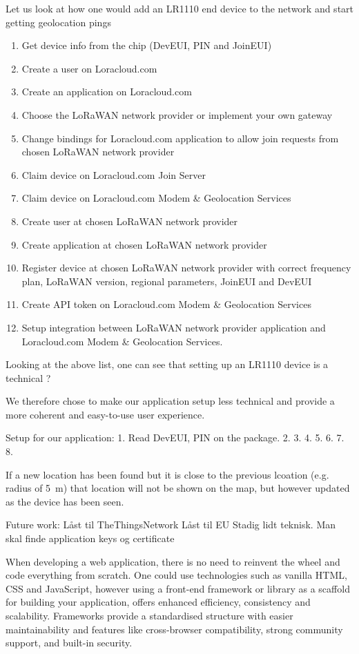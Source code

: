 Let us look at how one would add an LR1110 end device to the network and start getting geolocation pings
\begin{enumerate}
    \item Get device info from the chip (\ac{DevEUI}, PIN and \ac{JoinEUI})
    \item Create a user on Loracloud.com 
    \item Create an application on Loracloud.com
    \item Choose the \ac{LoRaWAN} network provider or implement your own gateway
    \item Change bindings for Loracloud.com application to allow join requests from chosen \ac{LoRaWAN} network provider
    \item Claim device on Loracloud.com Join Server
    \item Claim device on Loracloud.com Modem \& Geolocation Services
    \item Create user at chosen \ac{LoRaWAN} network provider
    \item Create application at chosen \ac{LoRaWAN} network provider
    \item Register device at chosen \ac{LoRaWAN} network provider with correct frequency plan, \ac{LoRaWAN} version, regional parameters, \ac{JoinEUI} and \ac{DevEUI}
    \item Create API token on Loracloud.com Modem \& Geolocation Services
    \item Setup integration between \ac{LoRaWAN} network provider application and Loracloud.com Modem \& Geolocation Services.
\end{enumerate}

Looking at the above list, one can see that setting up an LR1110 device is a technical ?

We therefore chose to make our application setup less technical and provide a more coherent and easy-to-use user experience.

Setup for our application:
1. Read \ac{DevEUI}, PIN on the package.
2. 
3.
4.
5.
6.
7.
8.

If a new location has been found but it is close to the previous lcoation (e.g. radius of \SI{5}{\meter}) that location will not be shown on the map, but however updated as the device has been seen.

Future work:
Låst til TheThingsNetwork
Låst til EU
Stadig lidt teknisk. Man skal finde application keys og certificate

When developing a web application, there is no need to reinvent the wheel and code everything from scratch. One could use technologies such as vanilla HTML, CSS and JavaScript, however using a front-end framework or library as a scaffold for building your application, offers enhanced efficiency, consistency and scalability. Frameworks provide a standardised structure with easier maintainability and features like cross-browser compatibility, strong community support, and built-in security.


